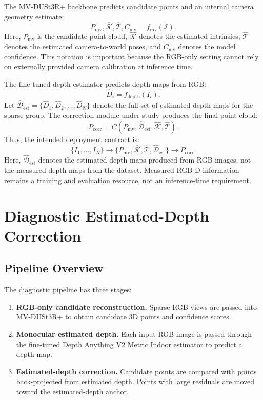 \documentclass[12pt,a4paper]{article}
\newcommand{\mvdp}{MV-DUSt3R+}
\newcommand{\da}{Depth Anything V2}
\begin{document}
The \mvdp{} backbone predicts candidate points and an internal camera geometry estimate:
\[
P_{\mathrm{mv}}, \hat{\mathcal{K}}, \hat{\mathcal{T}}, C_{\mathrm{mv}}
= f_{\mathrm{mv}}(\mathcal{I}).
\]
Here, \(P_{\mathrm{mv}}\) is the candidate point cloud, \(\hat{\mathcal{K}}\) denotes the estimated intrinsics, \(\hat{\mathcal{T}}\) denotes the estimated camera-to-world poses, and \(C_{\mathrm{mv}}\) denotes the model confidence. This notation is important because the RGB-only setting cannot rely on externally provided camera calibration at inference time.

The fine-tuned depth estimator predicts depth maps from RGB:
\[
\hat{D}_i = f_{\mathrm{depth}}(I_i).
\]
Let \(\hat{\mathcal{D}}_{\mathrm{est}}=\{\hat{D}_1,\hat{D}_2,\ldots,\hat{D}_N\}\) denote the full set of estimated depth maps for the sparse group.
The correction module under study produces the final point cloud:
\[
P_{\mathrm{corr}} = C(P_{\mathrm{mv}}, \hat{\mathcal{D}}_{\mathrm{est}}, \hat{\mathcal{K}}, \hat{\mathcal{T}}).
\]
Thus, the intended deployment contract is:
\[
\{I_1,\ldots,I_N\}
\longrightarrow
\{P_{\mathrm{mv}},\hat{\mathcal{K}},\hat{\mathcal{T}},\hat{\mathcal{D}}_{\mathrm{est}}\}
\longrightarrow
P_{\mathrm{corr}}.
\]
Here, \(\hat{\mathcal{D}}_{\mathrm{est}}\) denotes the estimated depth maps produced from RGB images, not the measured depth maps from the dataset.
Measured RGB-D information remains a training and evaluation resource, not an inference-time requirement.

\section{Diagnostic Estimated-Depth Correction}
\subsection{Pipeline Overview}
The diagnostic pipeline has three stages:
\begin{enumerate}[leftmargin=1.2cm]
    \item \textbf{RGB-only candidate reconstruction.} Sparse RGB views are passed into \mvdp{} to obtain candidate 3D points and confidence scores.
    \item \textbf{Monocular estimated depth.} Each input RGB image is passed through the fine-tuned \da{} Metric Indoor estimator to predict a depth map.
    \item \textbf{Estimated-depth correction.} Candidate points are compared with points back-projected from estimated depth. Points with large residuals are moved toward the estimated-depth anchor.
\end{enumerate}
\end{document}
